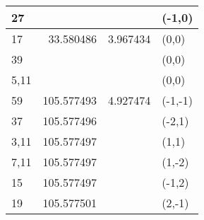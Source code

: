 \begin{table}
\begin{tabular}{l|r|l|l}
27 &           &          & (-1,0)  \\
    \hline
17 & 33.580486 & 3.967434 & (0,0) \\
39 &           &          & (0,0) \\
5,11 &         &          & (0,0) \\
    \hline
59   & 105.577493 & 4.927474 & (-1,-1) \\
37   & 105.577496 &          & (-2,1) \\
3,11 & 105.577497 &          & (1,1) \\
7,11 & 105.577497 &          & (1,-2) \\
15  &  105.577497 &          & (-1,2) \\
19   & 105.577501 &          & (2,-1) \\
	\hline
    \end{tabular}
\label{tab:ListLength2}
\end{table}

